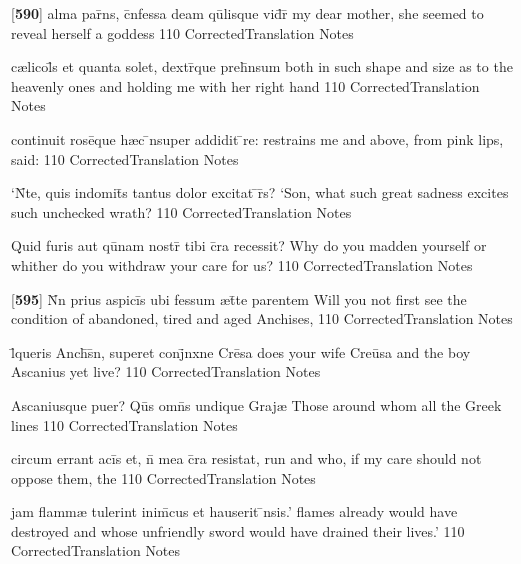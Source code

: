 \latline
  {[\textbf{590}] alma par\={}ns, c\={}nfessa deam qu\={}lisque vid\={}r\={\macron {\i}}}
  { my dear mother, she seemed to reveal herself a goddess }
  {110}
  { CorrectedTranslation }
  { Notes }


\latline
  {c{\ae}licol\={\macron {\i}}s et quanta solet, dextr\={}que preh\={}nsum}
  { both in such shape and size as to the heavenly ones and holding me with her right hand }
  {110}
  { CorrectedTranslation }
  { Notes }


\latline
  {continuit rose\={}que h{\ae}c \={\macron {\i}}nsuper addidit \={}re:}
  { restrains me and above, from pink lips, said: }
  {110}
  { CorrectedTranslation }
  { Notes }


\latline
  {`N\={}te, quis indomit\={}s tantus dolor excitat \={\macron {\i}}r\={}s?}
  { `Son, what such great sadness excites such unchecked wrath? }
  {110}
  { CorrectedTranslation }
  { Notes }


\latline
  {Quid furis aut qu\={}nam nostr\={\macron {\i}} tibi c\={}ra recessit?}
  { Why do you madden yourself or whither do you withdraw your care for us? }
  {110}
  { CorrectedTranslation }
  { Notes }


\latline
  {[\textbf{595}] N\={}n prius aspici\={}s ubi fessum {\ae}t\={}te parentem}
  { Will you not first see the condition of abandoned, tired and aged Anchises,  }
  {110}
  { CorrectedTranslation }
  { Notes }


\latline
  {l\={\macron {\i}}queris Anch\={\macron {\i}}s\={}n, superet conj\={}nxne Cre\={}sa}
  { does your wife Cre\={u}sa and the boy Ascanius yet live? }
  {110}
  { CorrectedTranslation }
  { Notes }


\latline
  {Ascaniusque puer?  Qu\={}s omn\={\macron {\i}}s undique Graj{\ae}}
  { Those around whom all the Greek lines  }
  {110}
  { CorrectedTranslation }
  { Notes }


\latline
  {circum errant aci\={}s et, n\={\macron {\i}} mea c\={}ra resistat,}
  { run and who, if my care should not oppose them, the  }
  {110}
  { CorrectedTranslation }
  { Notes }


\latline
  {jam flamm{\ae} tulerint inim\={\macron {\i}}cus et hauserit \={}nsis.'}
  { flames already would have destroyed and whose unfriendly sword would have drained their lives.' }
  {110}
  { CorrectedTranslation }
  { Notes }


